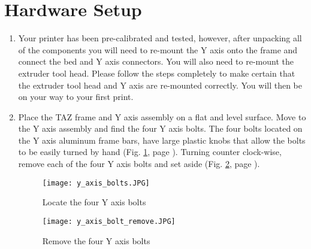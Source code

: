 
\section{Hardware Setup}
\begin{enumerate}
\item Your printer has been pre-calibrated and tested, however, after unpacking all of the components you will need to re-mount the Y axis onto the frame and connect the bed and Y axis connectors. You will also need to re-mount the extruder tool head. Please follow the steps completely to make certain that the extruder tool head and Y axis are re-mounted correctly. You will then be on your way to your first print.

\item Place the TAZ frame and Y axis assembly on a flat and level surface. Move to the Y axis assembly and find the four Y axis bolts. The four bolts located on the Y axis aluminum frame bars, have large plastic knobs that allow the bolts to be easily turned by hand (Fig. \ref{fig:Y_axis_bolts}, page \pageref{fig:Y_axis_bolts}). Turning counter clock-wise, remove each of the four Y axis bolts and set aside (Fig. \ref{fig:remove_Y_axis_bolts}, page \pageref{fig:remove_Y_axis_bolts}).

\begin{figure}[hp]
\centering
\texttt{[image: y\_axis\_bolts.JPG]}
\caption{Locate the four Y axis bolts}
\label{fig:Y_axis_bolts}
\end{figure}

\begin{figure}[H]
\centering
\texttt{[image: y\_axis\_bolt\_remove.JPG]}
\caption{Remove the four Y axis bolts}
\label{fig:remove_Y_axis_bolts}
\end{figure}


\end{enumerate}
